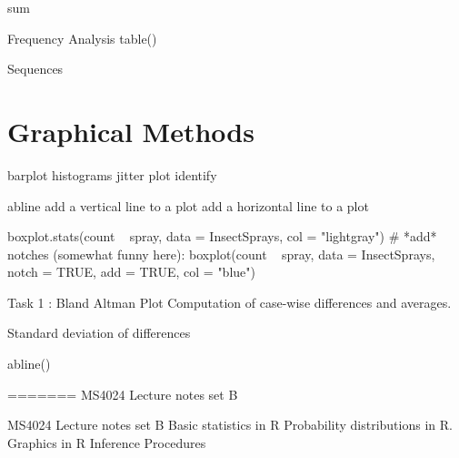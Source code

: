 sum

 
 

Frequency Analysis
table()
 
Sequences 
 



\section{Graphical Methods}

barplot
histograms
jitter
plot
identify

abline
add a vertical line to a plot
add a horizontal line to a plot
 
boxplot.stats(count ~ spray, data = InsectSprays, col = "lightgray")
# *add* notches (somewhat funny here):
boxplot(count ~ spray, data = InsectSprays,        notch = TRUE, add = TRUE, col = "blue")



 
Task 1 : Bland Altman Plot
Computation of case-wise differences and averages.
 
Standard deviation of differences
 
abline()
 
 

 
=======
MS4024 Lecture notes set B

MS4024 Lecture notes set B
Basic statistics in R
Probability distributions in R.
Graphics in R
Inference Procedures
 
